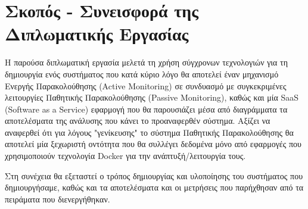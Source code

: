 \section{Σκοπός - Συνεισφορά της Διπλωματικής Εργασίας}
\label{section:contribution}



Η παρούσα διπλωματική εργασία μελετά τη χρήση σύγχρονων τεχνολογιών για τη δημιουργία ενός συστήματος που κατά κύριο λόγο
θα αποτελεί έναν μηχανισμό Ενεργής Παρακολούθησης (Active Monitoring) σε συνδυασμό με συγκεκριμένες λειτουργίες 
Παθητικής Παρακολούθησης (Passive Monitoring), καθώς και μία SaaS (Software as a Service) εφαρμογή που θα παρουσιάζει μέσα από
διαγράμματα τα αποτελέσματα της ανάλυσης που κάνει το προαναφερθέν σύστημα. Αξίζει να αναφερθεί ότι για λόγους "γενίκευσης" το σύστημα Παθητικής Παρακολούθησης θα αποτελεί μία ξεχωριστή οντότητα που θα συλλέγει δεδομένα μόνο από εφαρμογές που χρησιμοποιούν τεχνολογία Docker για την ανάπτυξή/λειτουργία τους.

Στη συνέχεια θα εξεταστεί ο τρόπος δημιουργίας και υλοποίησης του συστήματος που δημιουργήσαμε, καθώς και τα αποτελέσματα και οι μετρήσεις που παρήχθησαν από τα πειράματα που διενεργήθηκαν.  